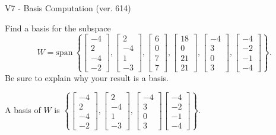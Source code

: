 \begin{exercise}
  \begin{exerciseTitle}V7 - Basis Computation (ver. 614)\end{exerciseTitle}
  \begin{exerciseStatement}
    Find a basis for the subspace 
\[W=\mathrm{span}\ \left\{\left[\begin{array}{r}
-4 \\
2 \\
-4 \\
-2
\end{array}\right] , \left[\begin{array}{r}
2 \\
-4 \\
1 \\
-3
\end{array}\right] , \left[\begin{array}{r}
6 \\
0 \\
7 \\
7
\end{array}\right] , \left[\begin{array}{r}
18 \\
0 \\
21 \\
21
\end{array}\right] , \left[\begin{array}{r}
-4 \\
3 \\
0 \\
3
\end{array}\right] , \left[\begin{array}{r}
-4 \\
-2 \\
-1 \\
-4
\end{array}\right]\right\}.\]
 Be sure to explain why your result is a basis.


  \end{exerciseStatement}
  \begin{exerciseAnswer}
   A basis of \(W\) is  \(\left\{\left[\begin{array}{r}
-4 \\
2 \\
-4 \\
-2
\end{array}\right] , \left[\begin{array}{r}
2 \\
-4 \\
1 \\
-3
\end{array}\right] , \left[\begin{array}{r}
-4 \\
3 \\
0 \\
3
\end{array}\right] \left[\begin{array}{r}
-4 \\
-2 \\
-1 \\
-4
\end{array}\right]\right\}\).
  


  \end{exerciseAnswer}
\end{exercise}